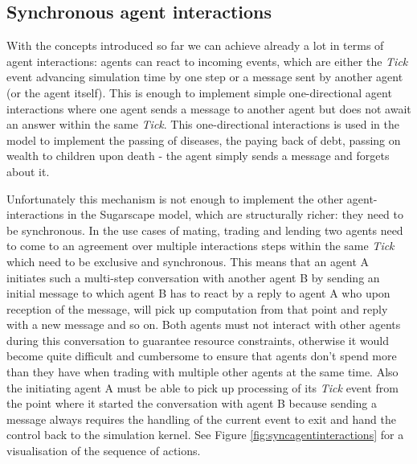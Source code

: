\subsection{Synchronous agent interactions}
With the concepts introduced so far we can achieve already a lot in terms of agent interactions: agents can react to incoming events, which are either the \textit{Tick} event advancing simulation time by one step or a message sent by another agent (or the agent itself). This is enough to implement simple one-directional agent interactions where one agent sends a message to another agent but does not await an answer within the same \textit{Tick}. This one-directional interactions is used in the model to implement the passing of diseases, the paying back of debt, passing on wealth to children upon death - the agent simply sends a message and forgets about it.

Unfortunately this mechanism is not enough to implement the other agent-interactions in the Sugarscape model, which are structurally richer: they need to be synchronous. In the use cases of mating, trading and lending two agents need to come to an agreement over multiple interactions steps within the same \textit{Tick} which need to be exclusive and synchronous.  This means that an agent A initiates such a multi-step conversation with another agent B by sending an initial message to which agent B has to react by a reply to agent A who upon reception of the message, will pick up computation from that point and reply with a new message and so on. Both agents must not interact with other agents during this conversation to guarantee resource constraints, otherwise it would become quite difficult and cumbersome to ensure that agents don't spend more than they have when trading with multiple other agents at the same time. Also the initiating agent A must be able to pick up processing of its \textit{Tick} event from the point where it started the conversation with agent B because sending a message always requires the handling of the current event to exit and hand the control back to the simulation kernel. See Figure \ref{fig:syncagentinteractions} for a visualisation of the sequence of actions.

